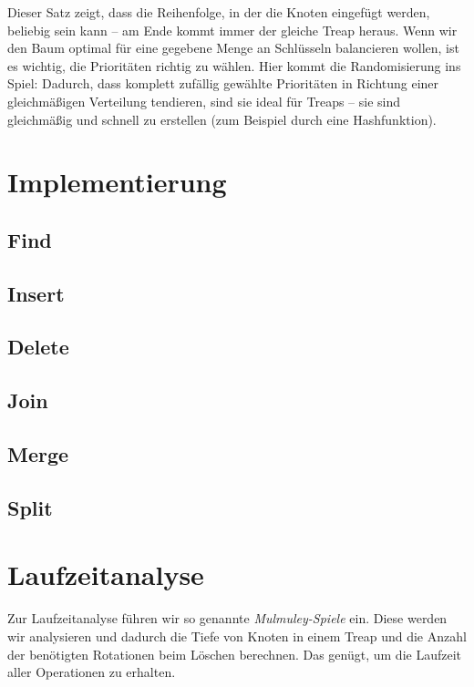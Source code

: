 \documentclass[a4paper]{scrreprt}
\theoremstyle{definition}
\begin{document}
Dieser Satz zeigt, dass die Reihenfolge, in der die Knoten eingefügt werden, beliebig sein kann -- am Ende kommt immer der gleiche Treap heraus. Wenn wir den Baum optimal für eine gegebene Menge an Schlüsseln balancieren wollen, ist es wichtig, die Prioritäten richtig zu wählen. Hier kommt die Randomisierung ins Spiel: Dadurch, dass komplett zufällig gewählte Prioritäten in Richtung einer gleichmäßigen Verteilung tendieren, sind sie ideal für Treaps -- sie sind gleichmäßig und schnell zu erstellen (zum Beispiel durch eine Hashfunktion).

\section{Implementierung}
\label{sec:implementing}

\subsection{Find}
\label{sec:find}

\subsection{Insert}
\label{sec:insert}

\subsection{Delete}
\label{sec:delete}

\subsection{Join}
\label{sec:join}

\subsection{Merge}
\label{sec:merge}

\subsection{Split}
\label{sec:split}

\section{Laufzeitanalyse}
\label{sec:runtime}
Zur Laufzeitanalyse führen wir so genannte \emph{Mulmuley-Spiele} ein.
Diese werden wir analysieren und dadurch die Tiefe von Knoten in einem Treap und die Anzahl der benötigten Rotationen beim Löschen berechnen.
Das genügt, um die Laufzeit aller Operationen zu erhalten.
\end{document}
